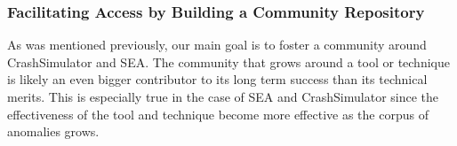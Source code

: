 



%



\subsubsection{Facilitating Access by Building a Community Repository}

As was mentioned previously, our main goal is to foster a community around
CrashSimulator and SEA.  The community that grows around a tool or
technique is likely an even bigger contributor to its long term success
than its technical merits.  This is especially true in the case of SEA and
CrashSimulator since the effectiveness of the tool and technique
become more effective
as the corpus of anomalies grows.

